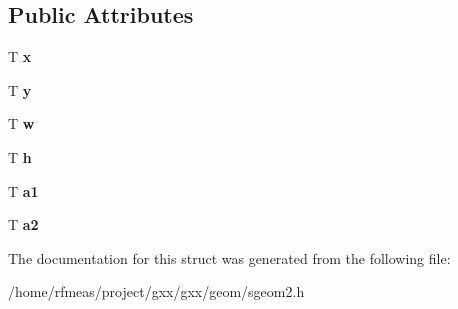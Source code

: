 \subsection*{Public Attributes}
\begin{DoxyCompactItemize}
\item 
T {\bfseries x}\hypertarget{structgxx_1_1sgeom2_1_1arc_aceca8018c818f262614da61087acfaa5}{}\label{structgxx_1_1sgeom2_1_1arc_aceca8018c818f262614da61087acfaa5}

\item 
T {\bfseries y}\hypertarget{structgxx_1_1sgeom2_1_1arc_a21bb7ecae1eb51e584f949796b520bae}{}\label{structgxx_1_1sgeom2_1_1arc_a21bb7ecae1eb51e584f949796b520bae}

\item 
T {\bfseries w}\hypertarget{structgxx_1_1sgeom2_1_1arc_a6402054b1045e6bf4a8fe6c654a6d7ca}{}\label{structgxx_1_1sgeom2_1_1arc_a6402054b1045e6bf4a8fe6c654a6d7ca}

\item 
T {\bfseries h}\hypertarget{structgxx_1_1sgeom2_1_1arc_aba4128e7aeb022da0f5926c0a3054834}{}\label{structgxx_1_1sgeom2_1_1arc_aba4128e7aeb022da0f5926c0a3054834}

\item 
T {\bfseries a1}\hypertarget{structgxx_1_1sgeom2_1_1arc_a2808f13aba1886c257c990f43483082c}{}\label{structgxx_1_1sgeom2_1_1arc_a2808f13aba1886c257c990f43483082c}

\item 
T {\bfseries a2}\hypertarget{structgxx_1_1sgeom2_1_1arc_a6c965349a25cdc1585cc23efb41890d0}{}\label{structgxx_1_1sgeom2_1_1arc_a6c965349a25cdc1585cc23efb41890d0}

\end{DoxyCompactItemize}


The documentation for this struct was generated from the following file\+:\begin{DoxyCompactItemize}
\item 
/home/rfmeas/project/gxx/gxx/geom/sgeom2.\+h\end{DoxyCompactItemize}

